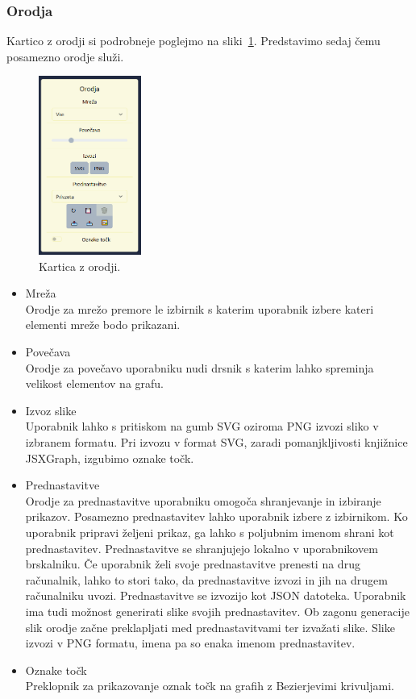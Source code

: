 \documentclass[isrm2, tisk]{fmfdelo}
\begin{document}
    \subsubsection{Orodja}
    Kartico z orodji si podrobneje poglejmo na sliki~\ref{fig:bezeg:kartica-z-orodji}.
    Predstavimo sedaj čemu posamezno orodje služi.
    \begin{figure}[h]
        \centering
        \includegraphics[width = 0.30\textwidth]{images/bezeg/orodja}
        \caption{Kartica z orodji.}
        \label{fig:bezeg:kartica-z-orodji}
    \end{figure}
    \begin{itemize}
        \item Mreža\\
        Orodje za mrežo premore le izbirnik s katerim uporabnik izbere kateri elementi mreže bodo prikazani.
        \item Povečava\\
        Orodje za povečavo uporabniku nudi drsnik s katerim lahko spreminja velikost elementov na grafu.
        \item Izvoz slike \\
        Uporabnik lahko s pritiskom na gumb SVG oziroma PNG izvozi sliko v izbranem formatu.
        Pri izvozu v format SVG, zaradi pomanjkljivosti knjižnice JSXGraph, izgubimo oznake točk.
        \item Prednastavitve \\
        Orodje za prednastavitve uporabniku omogoča shranjevanje in izbiranje prikazov.
        Posamezno prednastavitev lahko uporabnik izbere z izbirnikom.
        Ko uporabnik pripravi željeni prikaz, ga lahko s poljubnim imenom shrani kot prednastavitev.
        Prednastavitve se shranjujejo lokalno v uporabnikovem brskalniku.
        Če uporabnik želi svoje prednastavitve prenesti na drug računalnik, lahko to stori tako, da prednastavitve izvozi in jih na drugem računalniku uvozi.
        Prednastavitve se izvozijo kot JSON datoteka.
        Uporabnik ima tudi možnost generirati slike svojih prednastavitev.
        Ob zagonu generacije slik orodje začne preklapljati med prednastavitvami ter izvažati slike.
        Slike izvozi v PNG formatu, imena pa so enaka imenom prednastavitev.
        \item Oznake točk\\
        Preklopnik za prikazovanje oznak točk na grafih z Bezierjevimi krivuljami.
    \end{itemize}
\end{document}
